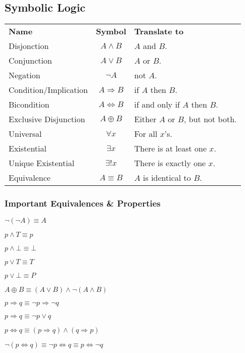 \documentclass[5pt]{article}
\begin{document}
\begin{multicols}{2}
\subsection{Symbolic Logic}
\begin{tabular}{lcl}
    \textbf{Name}           & \textbf{Symbol}       & \textbf{Translate to}\\
    Disjonction             & $A\land B$            & $A$ and $B$.\\
    Conjunction             & $A\lor B$             & $A$ or $B$.\\
    Negation                & $\lnot A$             & not $A$.\\
    Condition/Implication   & $A\Rightarrow B$      & if $A$ then $B$.\\
    Bicondition             & $A\Leftrightarrow B$  & if and only if $A$ then $B$.\\
    Exclusive Disjunction   & $A\oplus B$           & Either $A$ or $B$, but not both.\\
    Universal               & $\forall x$           & For all $x$'s.\\
    Existential             & $\exists x$           & There is at least one $x$.\\
    Unique Existential      & $\exists! x$          & There is exactly one $x$.\\
    Equivalence             & $A\equiv B$           & $A$ is identical to $B$.\\
\end{tabular}

\subsubsection{Important Equivalences \& Properties}
\begin{itemize*}
    \item $\lnot(\lnot A)\equiv A$
    \item $p\land T\equiv p$
    \item $p\land\bot\equiv\bot$
    \item $p\lor T\equiv T$
    \item $p\lor\bot\equiv P$
    \item $A\oplus B\equiv (A\lor B)\land\lnot(A\land B)$
    \item $p\Rightarrow q\equiv \lnot p\Rightarrow \lnot q$
    \item $p\Rightarrow q\equiv \lnot p \lor q$
    \item $p\Leftrightarrow q\equiv (p\Rightarrow q)\land(q\Rightarrow p)$
    \item $\lnot (p\Leftrightarrow q)\equiv \lnot p \Leftrightarrow q\equiv p \Leftrightarrow \lnot q$
\end{itemize*}


\end{multicols}
\end{document}
